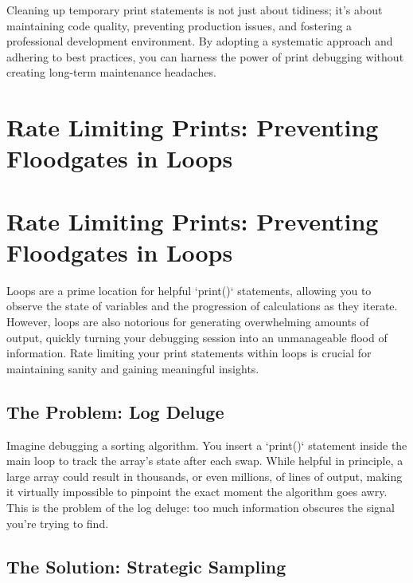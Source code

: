 \documentclass{article}
\begin{document}
{{{Cleaning up temporary print statements is not just about tidiness; it's about maintaining code quality, preventing production issues, and fostering a professional development environment. By adopting a systematic approach and adhering to best practices, you can harness the power of print debugging without creating long-term maintenance headaches.

\newpage

\section*{Rate Limiting Prints: Preventing Floodgates in Loops} %
\label{chapter-4-7-Rate_Limiting_Prints__Preventing_Floodga}

\section*{Rate Limiting Prints: Preventing Floodgates in Loops}

Loops are a prime location for helpful `print()` statements, allowing you to observe the state of variables and the progression of calculations as they iterate. However, loops are also notorious for generating overwhelming amounts of output, quickly turning your debugging session into an unmanageable flood of information. Rate limiting your print statements within loops is crucial for maintaining sanity and gaining meaningful insights.

\subsection*{The Problem: Log Deluge}

Imagine debugging a sorting algorithm. You insert a `print()` statement inside the main loop to track the array's state after each swap. While helpful in principle, a large array could result in thousands, or even millions, of lines of output, making it virtually impossible to pinpoint the exact moment the algorithm goes awry. This is the problem of the log deluge: too much information obscures the signal you're trying to find.

\subsection*{The Solution: Strategic Sampling}

}}}
\end{document}
